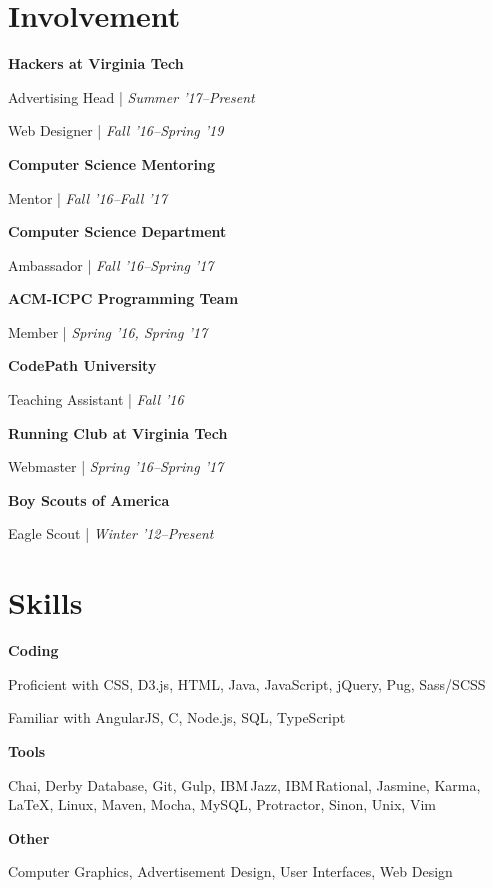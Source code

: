 \documentclass[9pt]{extarticle}
\newcommand{\Subsection}[2]{
    {\normalsize\bfseries\color{subsection}#1}
    \begin{trivlist}
        \color{bullet}#2
    \end{trivlist}
}
\newcommand{\ChronoItem}[2]{
    \item {\color{bullet}#1 | {\footnotesize\textit{#2}}}
}
\begin{document}
\begin{paracol}{2}
\begin{rightcolumn}
        \section{Involvement}
            \Subsection{Hackers at Virginia Tech}{
                \ChronoItem{Advertising Head}{Summer '17--Present}
                \ChronoItem{Web Designer}{Fall '16--Spring '19}
            }
            \vfill
            \Subsection{Computer Science Mentoring}{
                \ChronoItem{Mentor}{Fall '16--Fall '17}
            }
            \vfill
            \Subsection{Computer Science Department}{
                \ChronoItem{Ambassador}{Fall '16--Spring '17}
            }
            \vfill
            \Subsection{ACM-ICPC Programming Team}{
                \ChronoItem{Member}{Spring '16, Spring '17}
            }
            \vfill
            \Subsection{CodePath University}{
                \ChronoItem{Teaching Assistant}{Fall '16}
            }
            \vfill
            \Subsection{Running Club at Virginia Tech}{
                \ChronoItem{Webmaster}{Spring '16--Spring '17}
            }
            \vfill
            \Subsection{Boy Scouts of America}{
                \ChronoItem{Eagle Scout}{Winter '12--Present}
            }
        \vfill
        \section{Skills}
            \Subsection{Coding}{
                \item Proficient with CSS, D3.js, HTML, Java, JavaScript, jQuery, Pug, Sass/SCSS
                \item Familiar with AngularJS, C, Node.js, SQL, TypeScript
            }
            \vfill
            \Subsection{Tools}{
                \item Chai, Derby Database, Git, Gulp, IBM\,Jazz, IBM\,Rational, Jasmine, Karma, LaTeX, Linux, Maven, Mocha, MySQL, Protractor, Sinon, Unix, Vim
            }
            \vfill
            \Subsection{Other}{
                \item Computer Graphics, Advertisement Design, User Interfaces, Web Design
            }
        \pagebreak
    \end{rightcolumn}
\end{paracol}
\end{document}
